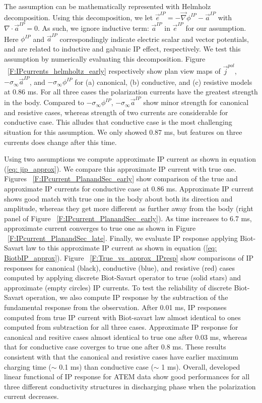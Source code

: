 \documentclass[a4paper, 11pt]{article}
\renewcommand{\div}{\nabla\cdot}
\newcommand{\grad}{\vec \nabla}
\newcommand{\siginf}{\sigma_\infty}
\renewcommand {\j}  { {\vec j} }
\newcommand {\e}  { {\vec e} }
\begin{document}
The assumption can be mathematically represented with Helmholz decomposition. 
Using this decomposition, we let $\e^{IP} = -\grad \phi^{IP} - \vec{a}^{IP}$ with $\div \vec{a}^{IP} = 0$.
As such, we ignore inductive term: $\vec{a}^{IP}$ in $\e^{IP}$ for our assumption. 
Here $\phi^{IP}$ and $\vec{a}^{IP}$ correspondingly indicate electric scalar and vector potentials, and are related to inductive and galvanic IP effect, respectively. 
We test this assumption by numerically evaluating this decomposition. 
Figure ~\ref{F:IPcurrents_helmholtz_early} respectively show plan view maps of $\j^{pol}$, $-\siginf \vec{a}^{IP}$, and $-\siginf \phi^{IP}$ for (a) canonical, (b) conductive, and (c) resistive models at 0.86 ms.
For all three cases the polarization currents have the greatest strength in the body. 
Compared to $-\siginf \phi^{IP}$, $-\siginf \vec{a}^{IP}$ show minor strength for canonical and resistive cases, whereas strength of two currents are considerable for conductive case. 
This alludes that conductive case is the most challenging situation for this assumption.
We only showed 0.87 ms, but features on three currents does change after this time.

Using two assumptions we compute approximate IP current as shown in equation (\ref{eq: jip_approx}). 
We compare this approximate IP current with true one. 
Figures ~\ref{F:IPcurrent_PlanandSec_early} show comparison of the true and approximate IP currents for conductive case at 0.86 ms. 
Approximate IP current shows good match with true one in the body about both its direction and amplitude, whereas they get more different as further away from the body (right panel of Figure ~\ref{F:IPcurrent_PlanandSec_early}).
As time increases to 6.7 ms, approximate current converges to true one as shown in Figure ~\ref{F:IPcurrent_PlanandSec_late}.  
Finally, we evaluate IP response applying Biot-Savart law to this approximate IP current as shown in equation (\ref{eq: BiotbIP_approx}). 
Figure ~\ref{F:True_vs_approx_IPresp} show comparisons of IP responses for canonical (black), conductive (blue), and resistive (red) cases computed by applying discrete Biot-Savart operator to true (solid stars) and approximate (empty circles) IP currents. 
To test the reliability of discrete Biot-Savart operation, we also compute IP response by the subtraction of the fundamental response from the observation.
After 0.01 ms, IP responses computed from true IP current with Biot-savart law almost identical to ones computed from subtraction for all three cases. 
Approximate IP response for canonical and resitive cases almost identical to true one after 0.03 ms, whereas that for conductive case coverges to true one after 0.8 ms. 
These results consistent with that the canonical and resistive cases have earlier maximum charging time ($\sim$ 0.1 ms) than conductive case ($\sim$ 1 ms).
Overall, developed linear functional of IP response for ATEM data show good performances for all three different conductivity structures in discharging phase when the polarization current decreases. 
\end{document}
